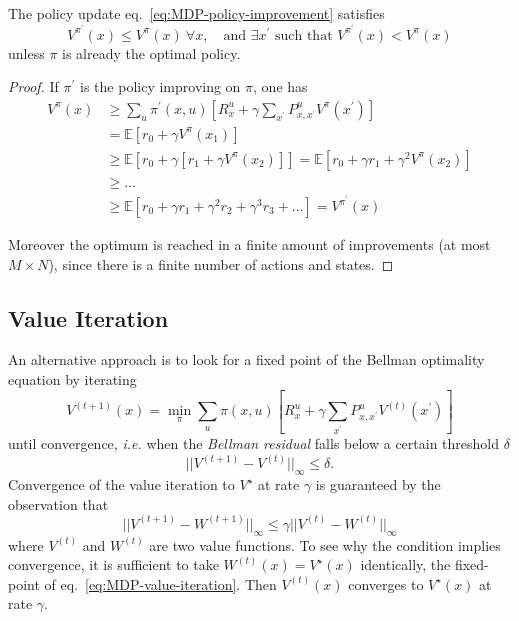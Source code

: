 \begin{theorem}
  The policy update eq.~\eqref{eq:MDP-policy-improvement} satisfies
  \begin{equation*}
    V^{\pi^\prime}(x) \le V^\pi(x)\ \forall x,\quad \text{and }\exists x^\prime \text{ such that }V^{\pi^\prime}(x) < V^\pi(x)
  \end{equation*}
  unless $\pi$ is already the optimal policy.
\end{theorem}
\begin{proof}
  If $\pi^\prime$ is the policy improving on $\pi$, one has
  \begin{align*}
    V^\pi(x) &\ge \sum_u \pi^\prime(x,u)\left[R^u_x + \gamma \sum_{x^\prime}P^u_{x,x^\prime} V^\pi(x^\prime)\right] \\
             &= \mathbb{E} \left[r_0 + \gamma V^\pi(x_1)\right] \\
             &\ge \mathbb{E} \left[r_0 + \gamma \left[r_1 + \gamma V^\pi(x_2)\right]\right] = \mathbb{E} \left[r_0 + \gamma r_1 + \gamma^2 V^\pi(x_2)\right] \\
             &\ge \ldots \\
             &\ge \mathbb{E} \left[r_0 + \gamma r_1 + \gamma^2 r_2 + \gamma^3 r_3 + \ldots \right] = V^{\pi^\prime}(x)
  \end{align*}

  Moreover the optimum is reached in a finite amount of improvements (at most $M\times N$), since there is a finite number of actions and states.
\end{proof}

\subsection{Value Iteration}
\label{sec:MDP-value-iteration}

An alternative approach is to look for a fixed point of the Bellman optimality equation by iterating
\begin{equation}
  \label{eq:MDP-value-iteration}
  V^{(t+1)}(x) = \min_\pi  \sum_u \pi(x,u)\left[R^u_x + \gamma \sum_{x^\prime}P^u_{x,x^\prime} V^{(t)}(x^\prime)\right]
\end{equation}
until convergence, \textit{i.e.} when the \emph{Bellman residual} falls below a certain threshold $\delta$
\begin{equation*}
  |\!| V^{(t+1)} - V^{(t)}|\!|_\infty \le \delta.
\end{equation*}
Convergence of the value iteration to $V^\star$ at rate $\gamma$ is guaranteed by the observation that
\begin{equation*}
  ||V^{(t+1)}-W^{(t+1)}||_\infty \le \gamma ||V^{(t)}-W^{(t)}||_\infty
\end{equation*}
where $V^{(t)}$ and $W^{(t)}$ are two value functions. To see why the condition implies convergence, it is sufficient to take $W^{(t)}(x) = V^\star(x)$ identically, the fixed-point of eq.~\eqref{eq:MDP-value-iteration}. Then $V^{(t)}(x)$ converges to $V^\star(x)$ at rate $\gamma$.

